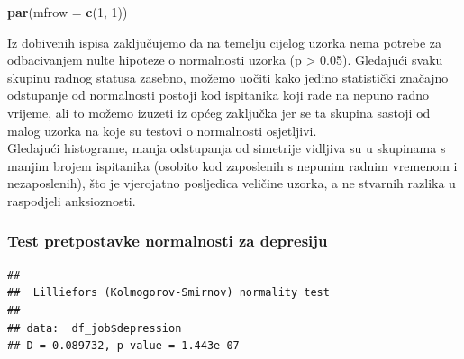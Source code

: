 \documentclass[
]{article}
\newenvironment{Shaded}{\begin{snugshade}}{\end{snugshade}}
\newcommand{\AttributeTok}[1]{\textcolor[rgb]{0.13,0.29,0.53}{#1}}
\newcommand{\CommentTok}[1]{\textcolor[rgb]{0.56,0.35,0.01}{\textit{#1}}}
\newcommand{\DecValTok}[1]{\textcolor[rgb]{0.00,0.00,0.81}{#1}}
\newcommand{\FunctionTok}[1]{\textcolor[rgb]{0.13,0.29,0.53}{\textbf{#1}}}
\newcommand{\NormalTok}[1]{#1}
\newcommand{\SpecialCharTok}[1]{\textcolor[rgb]{0.81,0.36,0.00}{\textbf{#1}}}
\newcommand{\StringTok}[1]{\textcolor[rgb]{0.31,0.60,0.02}{#1}}
\begin{document}
\begin{Shaded}
\begin{Highlighting}[]
\FunctionTok{par}\NormalTok{(}\AttributeTok{mfrow =} \FunctionTok{c}\NormalTok{(}\DecValTok{1}\NormalTok{, }\DecValTok{1}\NormalTok{))}
\end{Highlighting}
\end{Shaded}

Iz dobivenih ispisa zaključujemo da na temelju cijelog uzorka nema
potrebe za odbacivanjem nulte hipoteze o normalnosti uzorka (p
\textgreater{} 0.05). Gledajući svaku skupinu radnog statusa zasebno,
možemo uočiti kako jedino statistički značajno odstupanje od normalnosti
postoji kod ispitanika koji rade na nepuno radno vrijeme, ali to možemo
izuzeti iz općeg zaključka jer se ta skupina sastoji od malog uzorka na
koje su testovi o normalnosti osjetljivi.\\
Gledajući histograme, manja odstupanja od simetrije vidljiva su u
skupinama s manjim brojem ispitanika (osobito kod zaposlenih s nepunim
radnim vremenom i nezaposlenih), što je vjerojatno posljedica veličine
uzorka, a ne stvarnih razlika u raspodjeli anksioznosti.

\subsubsection{Test pretpostavke normalnosti za
depresiju}\label{test-pretpostavke-normalnosti-za-depresiju}

\begin{Shaded}
\end{Shaded}

\begin{verbatim}
## 
##  Lilliefors (Kolmogorov-Smirnov) normality test
## 
## data:  df_job$depression
## D = 0.089732, p-value = 1.443e-07
\end{verbatim}

\begin{Shaded}
\end{Shaded}
\end{document}

